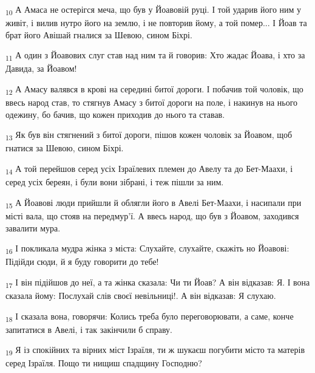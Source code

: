 \begin{tcolorbox}
\textsubscript{10} А Амаса не остерігся меча, що був у Йоавовій руці. І той ударив його ним у живіт, і вилив нутро його на землю, і не повторив йому, а той помер... І Йоав та брат його Авішай гналися за Шевою, сином Біхрі.
\end{tcolorbox}
\begin{tcolorbox}
\textsubscript{11} А один з Йоавових слуг став над ним та й говорив: Хто жадає Йоава, і хто за Давида, за Йоавом!
\end{tcolorbox}
\begin{tcolorbox}
\textsubscript{12} А Амасу валявся в крові на середині битої дороги. І побачив той чоловік, що ввесь народ став, то стягнув Амасу з битої дороги на поле, і накинув на нього одежину, бо бачив, що кожен приходив до нього та ставав.
\end{tcolorbox}
\begin{tcolorbox}
\textsubscript{13} Як був він стягнений з битої дороги, пішов кожен чоловік за Йоавом, щоб гнатися за Шевою, сином Біхрі.
\end{tcolorbox}
\begin{tcolorbox}
\textsubscript{14} А той перейшов серед усіх Ізраїлевих племен до Авелу та до Бет-Маахи, і серед усіх береян, і були вони зібрані, і теж пішли за ним.
\end{tcolorbox}
\begin{tcolorbox}
\textsubscript{15} А Йоавові люди прийшли й облягли його в Авелі Бет-Маахи, і насипали при місті вала, що стояв на передмур'ї. А ввесь народ, що був з Йоавом, заходився завалити мура.
\end{tcolorbox}
\begin{tcolorbox}
\textsubscript{16} І покликала мудра жінка з міста: Слухайте, слухайте, скажіть но Йоавові: Підійди сюди, й я буду говорити до тебе!
\end{tcolorbox}
\begin{tcolorbox}
\textsubscript{17} І він підійшов до неї, а та жінка сказала: Чи ти Йоав? А він відказав: Я. І вона сказала йому: Послухай слів своєї невільниці!. А він відказав: Я слухаю.
\end{tcolorbox}
\begin{tcolorbox}
\textsubscript{18} І сказала вона, говорячи: Колись треба було переговорювати, а саме, конче запитатися в Авелі, і так закінчили б справу.
\end{tcolorbox}
\begin{tcolorbox}
\textsubscript{19} Я із спокійних та вірних міст Ізраїля, ти ж шукаєш погубити місто та матерів серед Ізраїля. Пощо ти нищиш спадщину Господню?
\end{tcolorbox}
